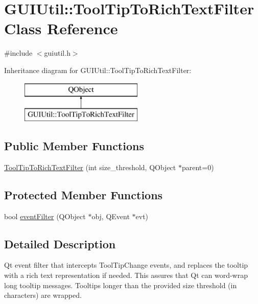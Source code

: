 \hypertarget{class_g_u_i_util_1_1_tool_tip_to_rich_text_filter}{}\section{G\+U\+I\+Util\+:\+:Tool\+Tip\+To\+Rich\+Text\+Filter Class Reference}
\label{class_g_u_i_util_1_1_tool_tip_to_rich_text_filter}


{\ttfamily \#include $<$guiutil.\+h$>$}

Inheritance diagram for G\+U\+I\+Util\+:\+:Tool\+Tip\+To\+Rich\+Text\+Filter\+:\begin{figure}[H]
\begin{center}
\leavevmode
\includegraphics[height=2.000000cm]{class_g_u_i_util_1_1_tool_tip_to_rich_text_filter}
\end{center}
\end{figure}
\subsection*{Public Member Functions}
\begin{DoxyCompactItemize}
\item 
\hyperlink{class_g_u_i_util_1_1_tool_tip_to_rich_text_filter_abdb48682c8ec34a8f774813cd9449f0d}{Tool\+Tip\+To\+Rich\+Text\+Filter} (int size\+\_\+threshold, Q\+Object $\ast$parent=0)
\end{DoxyCompactItemize}
\subsection*{Protected Member Functions}
\begin{DoxyCompactItemize}
\item 
bool \hyperlink{class_g_u_i_util_1_1_tool_tip_to_rich_text_filter_a5f4450d8b203f009a8bdc67d6d3f388c}{event\+Filter} (Q\+Object $\ast$obj, Q\+Event $\ast$evt)
\end{DoxyCompactItemize}


\subsection{Detailed Description}
Qt event filter that intercepts Tool\+Tip\+Change events, and replaces the tooltip with a rich text representation if needed. This assures that Qt can word-\/wrap long tooltip messages. Tooltips longer than the provided size threshold (in characters) are wrapped. 

